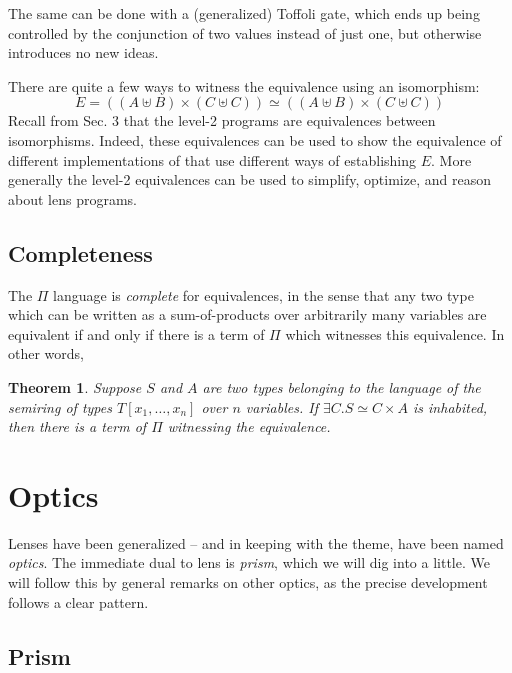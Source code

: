 \documentclass[sigplan,review,anonymous]{acmart}\settopmatter{printfolios=true,printccs=false,printacmref=false}
\newtheorem{theorem}{Theorem}[section]
\begin{document}
The same can be done with a (generalized) Toffoli gate, which ends up being
controlled by the conjunction of two values instead of just one, but otherwise
introduces no new ideas.

There are quite a few ways to witness the equivalence using an
isomorphism: \[ E = ((A ⊎ B) × (C ⊎ C)) ≃ ((A ⊎ B) × (C ⊎ C)) \]
Recall from Sec. 3 that the level-2 programs are equivalences between
isomorphisms. Indeed, these equivalences can be used to show the
equivalence of different implementations of 
that use different ways of establishing $E$. More generally the
level-2 equivalences can be used to simplify, optimize, and reason
about lens programs.



\subsection{Completeness}

The $\Pi$ language is \emph{complete} for equivalences, in the sense that
any two type which can be written as a sum-of-products over arbitrarily many
variables are equivalent if and only if there is a term of $\Pi$ which witnesses
this equivalence.  In other words,

\begin{theorem}
Suppose $S$ and $A$ are two types belonging to the language of the
semiring of types $T\left[x_{1},\ldots,x_{n}\right]$ over $n$ variables.
If $∃C. S ≃ C × A$ is inhabited, then there is a term of $\Pi$ witnessing
the equivalence.
\end{theorem}

\section{Optics}

Lenses have been generalized -- and in keeping with the theme, have been
named \emph{optics}. The immediate dual to lens is \emph{prism}, which
we will dig into a little. We will follow this by general remarks on
other optics, as the precise development follows a clear pattern.

\subsection{Prism}
\end{document}
